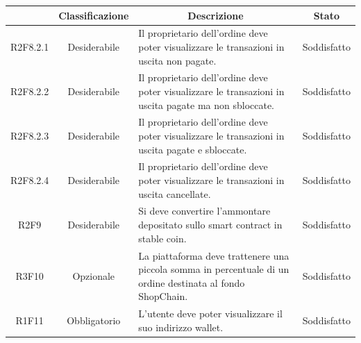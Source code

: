 \begin{table}[H]
    \centering
    \renewcommand{\arraystretch}{1.8}
    \begin{tabular}{c | c | p{6cm} | c}
        \rowcolor[HTML]{125E28}
        \multicolumn{1}{c}{\color[HTML]{FFFFFF} \textbf{Codice}}          &
        \multicolumn{1}{c}{\color[HTML]{FFFFFF} \textbf{Classificazione}} &
        \multicolumn{1}{c}{\color[HTML]{FFFFFF} \textbf{Descrizione}}     &
        \multicolumn{1}{c}{\color[HTML]{FFFFFF} \textbf{Stato}}                                                                                                                                                                  \\
        \hline
        R2F8.2.1                                                          & Desiderabile & Il proprietario dell'ordine deve poter visualizzare le transazioni in uscita non pagate.                   & Soddisfatto                  \\
        R2F8.2.2                                                          & Desiderabile & Il proprietario dell'ordine deve poter visualizzare le transazioni in uscita pagate ma non sbloccate.      & Soddisfatto                  \\
        R2F8.2.3                                                          & Desiderabile & Il proprietario dell'ordine deve poter visualizzare le transazioni in uscita pagate e sbloccate.           & Soddisfatto                  \\
        R2F8.2.4                                                          & Desiderabile & Il proprietario dell'ordine deve poter visualizzare le transazioni in uscita cancellate.                   & Soddisfatto                  \\
        R2F9                                                              & Desiderabile & Si deve convertire l'ammontare depositato sullo smart contract\glo{} in stable coin\glo{}.                 & Soddisfatto               \\
        R3F10                                                             & Opzionale    & La piattaforma deve trattenere una piccola somma in percentuale di un ordine destinata al fondo ShopChain. & Soddisfatto \\
        R1F11                                                             & Obbligatorio & L'utente deve poter visualizzare il suo indirizzo wallet\glo{}.                                                  & Soddisfatto                      \\

\end{tabular}
\end{table}
